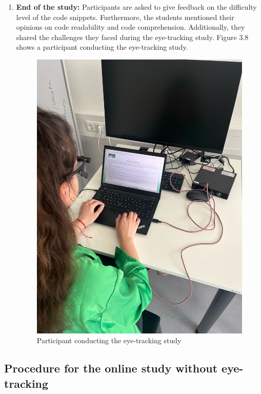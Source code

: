 \begin{enumerate}
    \item \textbf{End of the study:} 
    Participants are asked to give feedback on the difficulty level of the code snippets. Furthermore, the students mentioned their opinions on code readability and code comprehension. Additionally, they shared the challenges they faced during the eye-tracking study. Figure 3.8 shows a participant conducting the eye-tracking study.


\begin{figure} [H]
  \centering
  \includegraphics[scale=0.2]{figures/user.jpg}
  \caption{Participant conducting the eye-tracking study }
  \label{fig:AnhangsChor}
\end{figure}



\end{enumerate}



\subsection{Procedure for the online study without eye-tracking}


